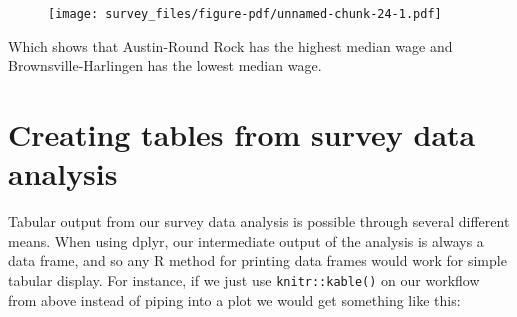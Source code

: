 \documentclass[
  letterpaper,
  DIV=11,
  numbers=noendperiod]{scrreprt}
\begin{document}
\begin{figure}[H]

{\centering \texttt{[image: survey\_files/figure-pdf/unnamed-chunk-24-1.pdf]}

}

\end{figure}

Which shows that Austin-Round Rock has the highest median wage and
Brownsville-Harlingen has the lowest median wage.

\hypertarget{creating-tables-from-survey-data-analysis}{%
\section{Creating tables from survey data
analysis}\label{creating-tables-from-survey-data-analysis}}

Tabular output from our survey data analysis is possible through several
different means. When using dplyr, our intermediate output of the
analysis is always a data frame, and so any R method for printing data
frames would work for simple tabular display. For instance, if we just
use \texttt{knitr::kable()} on our workflow from above instead of piping
into a plot we would get something like this:
\end{document}
